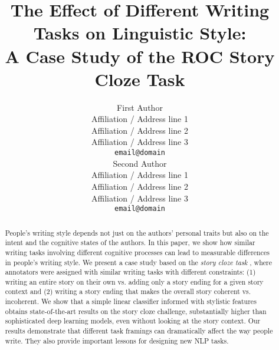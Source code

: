 \documentclass[11pt,a4paper]{article}
\title{The Effect of Different Writing Tasks on Linguistic Style:\\ A Case Study of the ROC Story Cloze Task}
\author{First Author \\
  Affiliation / Address line 1 \\
  Affiliation / Address line 2 \\
  Affiliation / Address line 3 \\
  {\tt email@domain} \\\And
  Second Author \\
  Affiliation / Address line 1 \\
  Affiliation / Address line 2 \\
  Affiliation / Address line 3 \\
  {\tt email@domain} \\}
\date{}
\begin{document}
\maketitle
\begin{abstract}
People's writing style depends not just on the authors' personal traits but also on the intent and the cognitive states of the authors. 
In this paper, we show how similar writing tasks involving different cognitive processes can lead to measurable differences in people's writing style. %
We present a case study based on 
the  {\it story cloze task} \cite{Mostafazadeh:2016}, %
where annotators were assigned with similar writing tasks with different constraints: (1) writing an entire story on their own vs. adding only a story ending for a given story context and (2) writing a story ending that makes the overall story coherent vs. incoherent. 
We show that a simple linear classifier informed with stylistic features obtains 
state-of-the-art results on the story cloze challenge,
substantially higher than sophisticated deep learning models,
even without looking at the story context. 
Our results demonstrate that different task framings can dramatically affect the way people write. 
They also provide important lessons for designing new NLP tasks.

\end{abstract}
\end{document}
